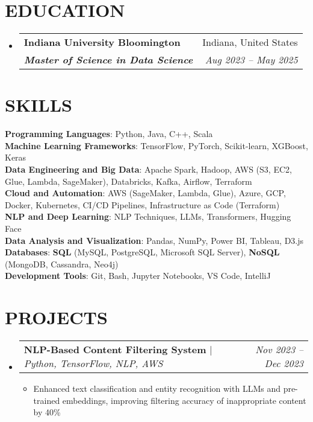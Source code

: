 \documentclass[letterpaper,11pt]{article}
\makeatletter
\newcommand{\resumeItem}[1]{
  \item\small{
    {#1 \vspace{-4pt}}
  }
}
\newcommand{\resumeSubheading}[4]{
  \vspace{-2pt}\item
    \begin{tabular*}{0.97\textwidth}[t]{l@{\extracolsep{\fill}}r}
      \textbf{#1} & #2 \\
      \textit{\small#3} & \textit{\small #4} \\
    \end{tabular*}\vspace{-7pt}
}
\newcommand{\resumeProjectHeading}[2]{
    \item
    \begin{tabular*}{0.97\textwidth}{l@{\extracolsep{\fill}}r}
      \small#1 & #2 \\
    \end{tabular*}\vspace{-7pt}
}
\newcommand{\resumeSubHeadingListStart}{\begin{itemize}[leftmargin=0.15in, label={}]}
\newcommand{\resumeSubHeadingListEnd}{\end{itemize}}
\newcommand{\resumeItemListStart}{\begin{itemize}}
\newcommand{\resumeItemListEnd}{\end{itemize}\vspace{-5pt}}
\makeatother
\begin{document}
\section{\textbf{EDUCATION}}
  \resumeSubHeadingListStart
    \resumeSubheading
      {Indiana University Bloomington}{Indiana, United States}
      {\textbf{Master of Science in Data Science}}{Aug 2023 -- May 2025}
  \resumeSubHeadingListEnd

\section{\textbf{SKILLS}}
 \begin{itemize}[leftmargin=0.15in, label={}]
    \small{\item{
     \textbf{Programming Languages}{: Python, Java, C++, Scala} \\
     \textbf{Machine Learning Frameworks}{: TensorFlow, PyTorch, Scikit-learn, XGBoost, Keras} \\
     \textbf{Data Engineering and Big Data}{: Apache Spark, Hadoop, AWS (S3, EC2, Glue, Lambda, SageMaker), Databricks, Kafka, Airflow, Terraform} \\
     \textbf{Cloud and Automation}{: AWS (SageMaker, Lambda, Glue), Azure, GCP, Docker, Kubernetes, CI/CD Pipelines, Infrastructure as Code (Terraform)} \\
     \textbf{NLP and Deep Learning}{: NLP Techniques, LLMs, Transformers, Hugging Face} \\
     \textbf{Data Analysis and Visualization}{: Pandas, NumPy, Power BI, Tableau, D3.js} \\
     \textbf{Databases}{: \textbf{SQL} (MySQL, PostgreSQL, Microsoft SQL Server), \textbf{NoSQL} (MongoDB, Cassandra, Neo4j)} \\
     \textbf{Development Tools}{: Git, Bash, Jupyter Notebooks, VS Code, IntelliJ} \\
    }}
 \end{itemize}

\section{\textbf{PROJECTS}}
    \resumeSubHeadingListStart
      \resumeProjectHeading
          {\textbf{NLP-Based Content Filtering System} $|$ \emph{Python, TensorFlow, NLP, AWS}}{\textit{Nov 2023 -- Dec 2023}}
          \resumeItemListStart
            \resumeItem{Enhanced text classification and entity recognition with LLMs and pre-trained embeddings, improving filtering accuracy of inappropriate content by 40\%}
          \resumeItemListEnd
    \resumeSubHeadingListEnd
\end{document}
